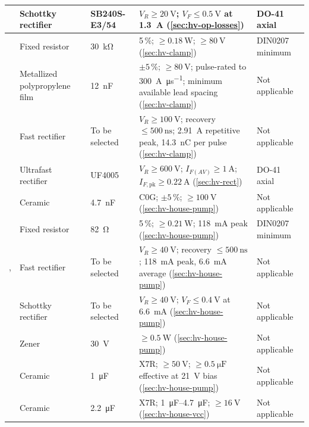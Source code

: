 {\begin{longtable}{|L{0.11\textwidth}|L{0.13\textwidth}|L{0.10\textwidth}|L{0.33\textwidth}|L{0.13\textwidth}|}
  \hline
   & Schottky rectifier & SB240S-E3/54 & $V_R\geq\SI{20}{\volt}$; $V_F\leq\SI{0.5}{\volt}$ at \SI{1.3}{\ampere} (\cref{sec:hv-op-losses}) & DO-41 axial \\
  \hline
   & Fixed resistor & \SI{30}{\kilo\ohm} & 5\,\%; $\geq\SI{0.18}{\watt}$; $\geq\SI{80}{\volt}$ (\cref{sec:hv-clamp}) & DIN0207 minimum \\
  \hline
   & Metallized polypropylene film & \SI{12}{\nano\farad} & $\pm5\,\%$; $\geq\SI{80}{\volt}$; pulse-rated to \SI{300}{\ampere\per\micro\second}; minimum available lead spacing (\cref{sec:hv-clamp}) & Not applicable \\
  \hline
   & Fast rectifier & To be selected & $V_R\geq\SI{100}{\volt}$; recovery $\leq\SI{500}{\nano\second}$; \SI{2.91}{\ampere} repetitive peak, \SI{14.3}{\nano\coulomb} per pulse (\cref{sec:hv-clamp}) & Not applicable \\
  \hline
   & Ultrafast rectifier & UF4005 & $V_R\geq\SI{600}{\volt}$; $I_{F(AV)}\geq\SI{1}{\ampere}$; $I_{F,\mathrm{pk}}\geq\SI{0.22}{\ampere}$ (\cref{sec:hv-rect}) & DO-41 axial \\
  \hline
   & Ceramic & \SI{4.7}{\nano\farad} & C0G; $\pm5\,\%$; $\geq\SI{100}{\volt}$ (\cref{sec:hv-house-pump}) & Not applicable \\
  \hline
   & Fixed resistor & \SI{82}{\ohm} & 5\,\%; $\geq\SI{0.21}{\watt}$; \SI{118}{\milli\ampere} peak (\cref{sec:hv-house-pump}) & DIN0207 minimum \\
  \hline
  ,  & Fast rectifier & To be selected & $V_R\geq\SI{40}{\volt}$; recovery $\leq\SI{500}{\nano\second}$; \SI{118}{\milli\ampere} peak, \SI{6.6}{\milli\ampere} average (\cref{sec:hv-house-pump}) & Not applicable \\
  \hline
   & Schottky rectifier & To be selected & $V_R\geq\SI{40}{\volt}$; $V_F\leq\SI{0.4}{\volt}$ at \SI{6.6}{\milli\ampere} (\cref{sec:hv-house-pump}) & Not applicable \\
  \hline
   & Zener & \SI{30}{\volt} & $\geq\SI{0.5}{\watt}$ (\cref{sec:hv-house-pump}) & Not applicable \\
  \hline
   & Ceramic & \SI{1}{\micro\farad} & X7R; $\geq\SI{50}{\volt}$; $\geq\SI{0.5}{\micro\farad}$ effective at \SI{21}{\volt} bias (\cref{sec:hv-house-pump}) & Not applicable \\
  \hline
   & Ceramic & \SI{2.2}{\micro\farad} & X7R; \SIrange{1}{4.7}{\micro\farad}; $\geq\SI{16}{\volt}$ (\cref{sec:hv-house-vcc}) & Not applicable \\

\end{longtable}}
